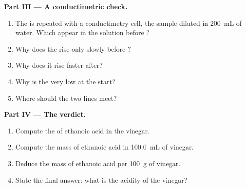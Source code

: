 \begin{problem}
\medskip
\noindent\textbf{Part III --- A conductimetric check.}
\begin{enumerate}[resume]
  \item The  is repeated with a conductimetry cell, the sample
        diluted in \qty{200}{mL} of water. Which  appear in the
        solution before ?
  \item Why does the  rise only slowly before ?
  \item Why does it rise faster after?
  \item Why is the  very low at the start?
  \item Where should the two lines meet?
\end{enumerate}

\medskip
\noindent\textbf{Part IV --- The verdict.}
\begin{enumerate}[resume]
  \item Compute the  of ethanoic acid in the vinegar.
  \item Compute the mass of ethanoic acid in \qty{100.0}{mL} of vinegar.
  \item Deduce the mass of ethanoic acid per \qty{100}{g} of vinegar.
  \item State the final answer: what is the acidity of the vinegar?
\end{enumerate}
\end{problem}

